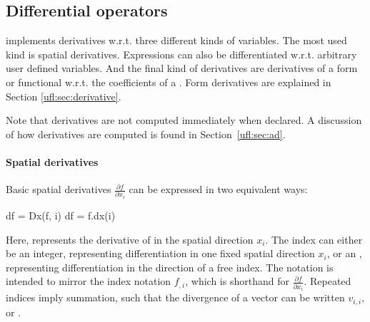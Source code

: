 \subsection{Differential operators} \label{ufl:sec:differential}
\index{$\nabla$}

\ufl{} implements derivatives w.r.t. three different kinds of
variables.  The most used kind is spatial derivatives.  Expressions
can also be differentiated w.r.t. arbitrary user defined variables.
And the final kind of derivatives are derivatives of a form or
functional w.r.t. the coefficients of a .  Form
derivatives are explained in Section \ref{ufl:sec:derivative}.

Note that derivatives are not computed immediately when declared.  A
discussion of how derivatives are computed is found in
Section~\ref{ufl:sec:ad}.

\paragraph{Spatial derivatives}
\label{ufl:sec:dx}

Basic spatial derivatives $\frac{\partial f}{\partial x_i}$ can be
expressed in two equivalent ways:
\begin{code}
df = Dx(f, i)
df = f.dx(i)
\end{code}
Here,  represents the derivative of  in the spatial
direction $x_i$. The index  can either be an integer,
representing differentiation in one fixed spatial direction $x_i$, or
an , representing differentiation in the direction of a
free index.  The notation  is intended to mirror the
index notation $f_{,i}$, which is shorthand for
$\frac{\partial f}{\partial x_i}$.  Repeated indices imply summation,
such that the divergence of a vector can be written $v_{i,i}$, or
.

